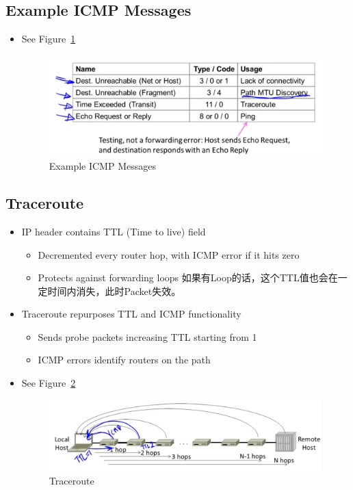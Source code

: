 \documentclass[12pt]{ctexart}   %
\begin{document}
	\subsection{Example ICMP Messages}
	\begin{itemize}
		\item See Figure~\ref{fig:4-8-3}
		
		\begin{figure}[h!] %
		\centering
		 \includegraphics[scale=0.7]{images/4-8-3}
		\caption{ Example ICMP Messages}
		 \label{fig:4-8-3}
		 \end{figure}
	\end{itemize}
	
	\subsection{Traceroute}
	\begin{itemize}
		\item IP header contains TTL (Time to live) field
		\begin{itemize}
			\item Decremented every router hop, with ICMP error if it hits zero
			\item Protects against forwarding loops 如果有Loop的话，这个TTL值也会在一定时间内消失，此时Packet失效。
		\end{itemize}
		
		\item Traceroute repurposes TTL and ICMP functionality
		\begin{itemize}
			\item Sends probe packets increasing TTL starting from 1
			\item ICMP errors identify routers on the path
		\end{itemize}
		\item See Figure~\ref{fig:4-8-4}
		
		\begin{figure}[h!] %
		\centering
		 \includegraphics[scale=0.7]{images/4-8-4}
		\caption{ Traceroute }
		 \label{fig:4-8-4}
		 \end{figure}
	\end{itemize}
	
\end{document}
